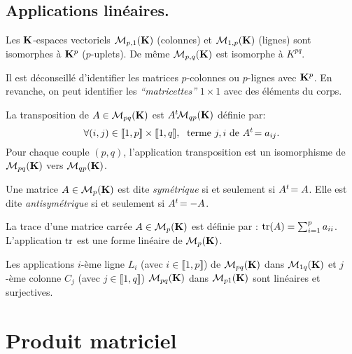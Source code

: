 \subsection{Applications linéaires.}
Les $\mathbf{K}$-espaces vectoriels $\mathcal M_{p,1}(\mathbf{K})$ (colonnes) et $\mathcal M_{1,p}(\mathbf{K})$ (lignes) sont isomorphes à $\mathbf{K}^p$ ($p$-uplets). De même $\mathcal M_{p,q}(\mathbf{K})$ est isomorphe à $K^{pq}$.
\begin{rem}
 Il est déconseillé d'identifier les matrices $p$-colonnes ou $p$-lignes avec $\mathbf{K}^p$. En revanche, on peut identifier les \emph{``matricettes''} $1\times1$ avec des éléments du corps.
\end{rem}

\begin{defi}[Transposition]
 La transposition de $A\in \mathcal{M}_{p q}(\mathbf{K})$ est $A\mathstrut^t\! \mathcal{M}_{q p}(\mathbf{K})$ définie par:
\[
 \forall (i,j) \in \llbracket 1,p \rrbracket \times \llbracket 1,q \rrbracket, \;
 \text{ terme $j,i$ de } A\mathstrut^t\! = a_{i j}.
\]
Pour chaque couple $(p,q)$, l'application transposition est un isomorphisme de $\mathcal{M}_{p q}(\mathbf{K})$ vers $\mathcal{M}_{q p}(\mathbf{K})$.
\end{defi}
\begin{defi}
 Une matrice $A\in \mathcal{M}_{p}(\mathbf{K})$ est dite \emph{symétrique} si et seulement si $A\mathstrut^t\! = A$. Elle est dite \emph{antisymétrique} si et seulement si $A\mathstrut^t\! = -A$.
\end{defi}

\begin{defi}[Trace]
 La trace d'une matrice carrée $A\in \mathcal{M}_p(\mathbf{K})$ est définie par : $\mathop{\mathrm{tr}}(A) = \sum_{i=1}^p a_{ii}$. L'application $\mathop{\mathrm{tr}}$ est une forme linéaire de $\mathcal{M}_p(\mathbf{K})$.
\end{defi}

Les applications $i$-ème ligne $L_i$ (avec $i\in\llbracket 1,p \rrbracket$) de $\mathcal{M}_{p q}(\mathbf{K})$ dans $\mathcal{M}_{1 q}(\mathbf{K})$ et $j$-ème colonne $C_j$ (avec $j\in\llbracket 1,q \rrbracket$) $\mathcal{M}_{p q}(\mathbf{K})$ dans $\mathcal{M}_{p 1}(\mathbf{K})$ sont linéaires et surjectives.

\section{Produit matriciel}
